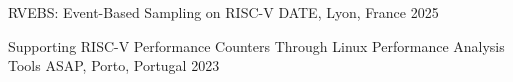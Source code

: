 
\begin{cvhonors}

    \cvhonor
    {RVEBS: Event-Based Sampling on RISC-V}
    {}
    {DATE, Lyon, France}
    {2025}

    \cvhonor
    {Supporting RISC-V Performance Counters Through Linux Performance Analysis Tools}
    {}
    {ASAP, Porto, Portugal}
    {2023}

















\end{cvhonors}
